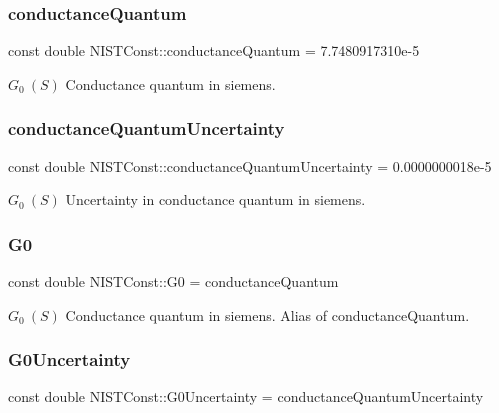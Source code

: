 \subsubsection{\texorpdfstring{conductance\+Quantum}{conductanceQuantum}}
{\footnotesize\ttfamily const double N\+I\+S\+T\+Const\+::conductance\+Quantum = 7.\+7480917310e-\/5}

$G_0 \ (S)$ Conductance quantum in siemens. \mbox{\label{group___conductance_quantum_ga599b808b8a742da1bb97cdb68f65cbf9}} 
\subsubsection{\texorpdfstring{conductance\+Quantum\+Uncertainty}{conductanceQuantumUncertainty}}
{\footnotesize\ttfamily const double N\+I\+S\+T\+Const\+::conductance\+Quantum\+Uncertainty = 0.\+0000000018e-\/5}

$G_0 \ (S)$ Uncertainty in conductance quantum in siemens. \mbox{\label{group___conductance_quantum_ga04bee7105fe6a217430a2db2913e7754}} 
\subsubsection{\texorpdfstring{G0}{G0}}
{\footnotesize\ttfamily const double N\+I\+S\+T\+Const\+::\+G0 = conductance\+Quantum}

$G_0 \ (S)$ Conductance quantum in siemens. Alias of conductance\+Quantum. \mbox{\label{group___conductance_quantum_gab513ebf6083eb652771a17515e895301}} 
\subsubsection{\texorpdfstring{G0\+Uncertainty}{G0Uncertainty}}
{\footnotesize\ttfamily const double N\+I\+S\+T\+Const\+::\+G0\+Uncertainty = conductance\+Quantum\+Uncertainty}

